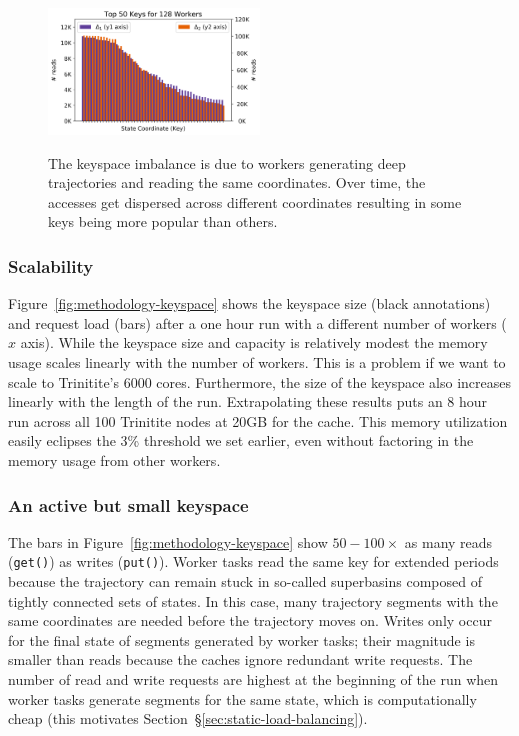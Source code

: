 \begin{figure}[t]
  \noindent\includegraphics[width=0.5\textwidth]{figures/methodology-keys.png}\\
  \caption{The keyspace imbalance is due to workers generating deep
  trajectories and reading the same coordinates. Over time, the accesses get
  dispersed across different coordinates resulting in some keys being more
  popular than others.\label{fig:methodology-keys}}
\end{figure}

\subsubsection*{Scalability} Figure~\ref{fig:methodology-keyspace} shows the
keyspace size (black annotations) and request load (bars) after a one hour run
with a different number of workers (\(x\) axis). While the keyspace size and
capacity is relatively modest the memory usage scales linearly with the number
of workers. This is a problem if we want to scale to Trinitite's 6000 cores.
Furthermore, the size of the keyspace also increases linearly with the length
of the run.  Extrapolating these results puts an 8 hour run across all 100
Trinitite nodes at 20GB for the cache.  This memory utilization easily eclipses
the 3\% threshold we set earlier, even without factoring in the memory usage
from other workers.

\subsubsection*{An active but small keyspace} The bars in
Figure~\ref{fig:methodology-keyspace} show \(50-100\times\) as many reads
(\texttt{get()}) as writes (\texttt{put()}).  Worker tasks read the same key
for extended periods because the trajectory can remain stuck in so-called
superbasins composed of tightly connected sets of states. In this case, many
trajectory segments with the same coordinates are needed before the trajectory
moves on.  Writes only occur for the final state of segments generated by
worker tasks; their magnitude is smaller than reads because the caches ignore
redundant write requests. The number of read and write requests are highest at
the beginning of the run when worker tasks generate segments for the same
state, which is computationally cheap (this motivates
Section~\S\ref{sec:static-load-balancing}).

